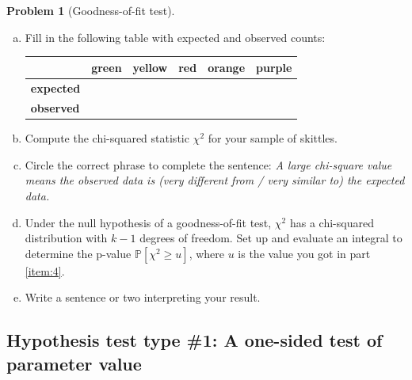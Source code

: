 \documentclass[10pt]{amsart}
\theoremstyle{definition}
\newtheorem{problem}[theorem]{Problem}
\newcommand{\1}[1]{\textbf{1}_{\left[#1\right]}} %
\def\P{\mathbb{P}} %
\begin{document}
\begin{problem}[Goodness-of-fit test]
\begin{enumerate}[(a)]
    \item Fill in the following table with expected and observed counts:
    \begin{center}
      \begin{tabular}{l|l|l|l|l|l|}
        & \textbf{green} & \textbf{yellow} & \textbf{  red  } & \textbf{orange} & \textbf{purple} \\ \hline
        \textbf{expected} &  $\phantom{\displaystyle\int}$ &   &       &   &   \\ \hline
        \textbf{observed} &  $\phantom{\displaystyle\int}$ &   &       &   &   \\ \hline
      \end{tabular}
    \end{center}
    \item Compute the chi-squared statistic $\chi^{2}$ for your sample of
    skittles. \label{item:4}
    \item Circle the correct phrase to complete the sentence: \textit{A large
      chi-square value means the observed data is (very different from / very
      similar to) the expected data.}
    \item Under the null hypothesis of a goodness-of-fit test, $\chi^{2}$ has
    a chi-squared distribution with $k-1$ degrees of freedom. Set up and
    evaluate an integral to determine the p-value
    $\P\left[\chi^{2}\geq u\right]$, where $u$ is the value you got in part \ref{item:4}.
    \item Write a sentence or two interpreting your result.
  \end{enumerate}
\end{problem}

\newpage
\subsection{Hypothesis test type \#1: A one-sided test of parameter value}
\end{document}
